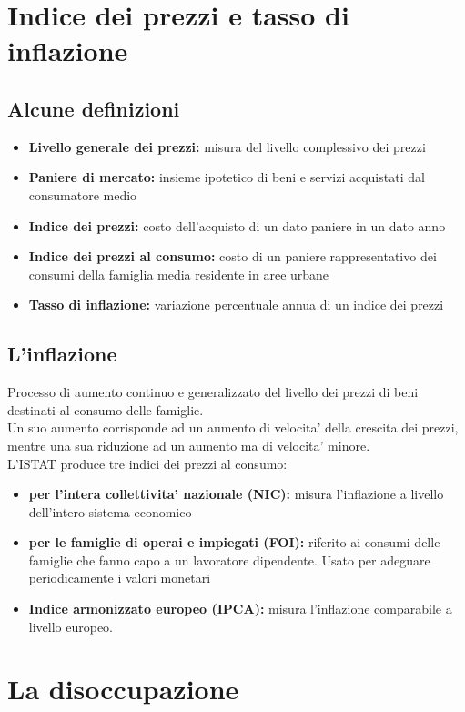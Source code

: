 \documentclass{report}
\begin{document}
	\section{Indice dei prezzi e tasso di inflazione}
	\subsection{Alcune definizioni}
	\begin{itemize}
		\item \textbf{Livello generale dei prezzi:} misura del livello complessivo dei prezzi
		\item \textbf{Paniere di mercato:} insieme ipotetico di beni e servizi acquistati dal consumatore medio
		\item \textbf{Indice dei prezzi:} costo dell'acquisto di un dato paniere in un dato anno
		\item \textbf{Indice dei prezzi al consumo:} costo di un paniere rappresentativo dei consumi della famiglia media residente in aree urbane
		\item \textbf{Tasso di inflazione:} variazione percentuale annua di un indice dei prezzi
	\end{itemize}
	\subsection{L'inflazione}
	Processo di aumento continuo e generalizzato del livello dei prezzi di beni destinati al consumo delle famiglie.\medskip \\Un suo aumento corrisponde ad un aumento di velocita' della crescita dei prezzi, mentre una sua riduzione ad un aumento ma di velocita' minore.\medskip \\
	L'ISTAT produce tre indici dei prezzi al consumo:
	\begin{itemize}
		\item \textbf{per l'intera collettivita' nazionale (NIC):} misura l'inflazione a livello dell'intero sistema economico
		\item \textbf{per le famiglie di operai e impiegati (FOI):} riferito ai consumi delle famiglie che fanno capo a un lavoratore dipendente. Usato per adeguare periodicamente i valori monetari
		\item \textbf{Indice armonizzato europeo (IPCA):} misura l'inflazione comparabile a livello europeo.
	\end{itemize}
	\section{La disoccupazione}
\end{document}
